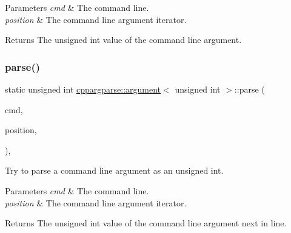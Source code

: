 \begin{DoxyParams}{Parameters}
{\em cmd} & The command line. \\
\hline
{\em position} & The command line argument iterator.\\
\hline
\end{DoxyParams}
\begin{DoxyReturn}{Returns}
The unsigned int value of the command line argument. 
\end{DoxyReturn}
\mbox{\label{structcppargparse_1_1argument_3_01unsigned_01int_01_4_ac9211f741e5688766a4ed489b33b5a1b}} 
\subsubsection{\texorpdfstring{parse()}{parse()}}
{\footnotesize\ttfamily static unsigned int \hyperlink{structcppargparse_1_1argument}{cppargparse\+::argument}$<$ unsigned int $>$\+::parse (\begin{DoxyParamCaption}\item[{const \hyperlink{types_8h_a80adf2418b7ce9fe616698efa7533ecf}{types\+::\+Command\+Line\+\_\+t} \&}]{cmd,  }\item[{const \hyperlink{types_8h_a43b4f43f8940de1bf09ced6f1b668053}{types\+::\+Command\+Line\+Position\+\_\+t} \&}]{position,  }\item[{const \hyperlink{types_8h_a003c660afe2ee9c6cc39aea966e8926d}{types\+::\+Command\+Line\+Arguments\+\_\+t} \&}]{ }\end{DoxyParamCaption})\hspace{0.3cm}{\ttfamily [inline]}, {\ttfamily [static]}}



Try to parse a command line argument as an unsigned int. 


\begin{DoxyParams}{Parameters}
{\em cmd} & The command line. \\
\hline
{\em position} & The command line argument iterator.\\
\hline
\end{DoxyParams}
\begin{DoxyReturn}{Returns}
The unsigned int value of the command line argument next in line. 
\end{DoxyReturn}
\mbox{\label{structcppargparse_1_1argument_3_01unsigned_01int_01_4_af8279570a5ca5f628c34b8d881b8ee25}} 
